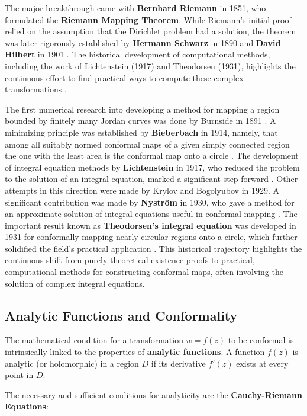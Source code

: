 \documentclass[12pt,a4paper]{article}
\begin{document}
The major breakthrough came with \textbf{Bernhard Riemann} in 1851, who
formulated the \textbf{Riemann Mapping Theorem}. While Riemann's initial
proof relied on the assumption that the Dirichlet problem had a
solution, the theorem was later rigorously established by
\textbf{Hermann Schwarz} in 1890 and \textbf{David Hilbert} in 1901
. The historical development of computational methods, including
the work of Lichtenstein (1917) and Theodorsen (1931), highlights the
continuous effort to find practical ways to compute these complex
transformations .

The first numerical research into developing a method for
mapping a region bounded by finitely many Jordan curves was done by
Burnside in 1891 . A minimizing principle was established by
\textbf{Bieberbach} in 1914, namely, that among all suitably normed
conformal maps of a given simply connected region the one with the least
area is the conformal map onto a circle . The development of
integral equation methods by \textbf{Lichtenstein} in 1917, who reduced
the problem to the solution of an integral equation, marked a
significant step forward . Other attempts in this direction were
made by Krylov and Bogolyubov in 1929. A significant contribution was
made by \textbf{Nyström} in 1930, who gave a method for an approximate
solution of integral equations useful in conformal mapping . The
important result known as \textbf{Theodorsen's integral equation} was
developed in 1931 for conformally mapping nearly circular regions onto a
circle, which further solidified the field's practical application
. This historical trajectory highlights the continuous shift from
purely theoretical existence proofs to practical, computational methods
for constructing conformal maps, often involving the solution of complex
integral equations.

\subsection{Analytic Functions and
Conformality}\label{analytic-functions-and-conformality}

The mathematical condition for a transformation \(w = f(z)\) to be
conformal is intrinsically linked to the properties of \textbf{analytic
functions}. A function \(f(z)\) is analytic (or holomorphic) in a region
\(D\) if its derivative \(f'(z)\) exists at every point in \(D\).

The necessary and sufficient conditions for analyticity are the
\textbf{Cauchy-Riemann Equations}:
\end{document}
